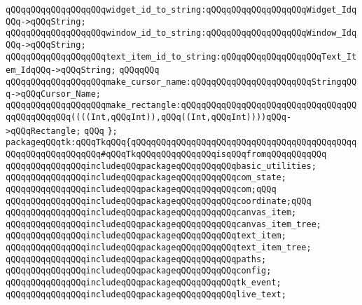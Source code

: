 \verb|qQQqqQQqqQQqqQQqqQQqwidget_id_to_string:qQQqqQQqqQQqqQQqqQQqWidget_IdqQQq->qQQqString;|\newline
\verb|qQQqqQQqqQQqqQQqqQQqwindow_id_to_string:qQQqqQQqqQQqqQQqqQQqWindow_IdqQQq->qQQqString;|\newline
\verb|qQQqqQQqqQQqqQQqqQQqtext_item_id_to_string:qQQqqQQqqQQqqQQqqQQqText_Item_IdqQQq->qQQqString;|\newline
\verb|qQQqqQQq|\newline
\verb|qQQqqQQqqQQqqQQqqQQqmake_cursor_name:qQQqqQQqqQQqqQQqqQQqqQQqStringqQQq->qQQqCursor_Name;|\newline
\verb|qQQqqQQqqQQqqQQqqQQqmake_rectangle:qQQqqQQqqQQqqQQqqQQqqQQqqQQqqQQqqQQqqQQqqQQqqQQq((((Int,qQQqInt)),qQQq((Int,qQQqInt))))qQQq->qQQqRectangle;|\newline
\verb|qQQq|\newline
\verb|};|\newline
\newline
\verb|packageqQQqtk:qQQqTkqQQq{qQQqqQQqqQQqqQQqqQQqqQQqqQQqqQQqqQQqqQQqqQQqqQQqqQQqqQQqqQQqqQQq#qQQqTkqQQqqQQqqQQqqQQqisqQQqfromqQQqqQQqqQQq|\newline
\newline
\verb|qQQqqQQqqQQqqQQqincludeqQQqpackageqQQqqQQqqQQqbasic_utilities;|\newline
\verb|qQQqqQQqqQQqqQQqincludeqQQqpackageqQQqqQQqqQQqcom_state;|\newline
\verb|qQQqqQQqqQQqqQQqincludeqQQqpackageqQQqqQQqqQQqcom;qQQq|\newline
\verb|qQQqqQQqqQQqqQQqincludeqQQqpackageqQQqqQQqqQQqcoordinate;qQQq|\newline
\verb|qQQqqQQqqQQqqQQqincludeqQQqpackageqQQqqQQqqQQqcanvas_item;|\newline
\verb|qQQqqQQqqQQqqQQqincludeqQQqpackageqQQqqQQqqQQqcanvas_item_tree;|\newline
\verb|qQQqqQQqqQQqqQQqincludeqQQqpackageqQQqqQQqqQQqtext_item;|\newline
\verb|qQQqqQQqqQQqqQQqincludeqQQqpackageqQQqqQQqqQQqtext_item_tree;|\newline
\verb|qQQqqQQqqQQqqQQqincludeqQQqpackageqQQqqQQqqQQqpaths;|\newline
\verb|qQQqqQQqqQQqqQQqincludeqQQqpackageqQQqqQQqqQQqconfig;|\newline
\verb|qQQqqQQqqQQqqQQqincludeqQQqpackageqQQqqQQqqQQqtk_event;|\newline
\verb|qQQqqQQqqQQqqQQqincludeqQQqpackageqQQqqQQqqQQqlive_text;|\newline
